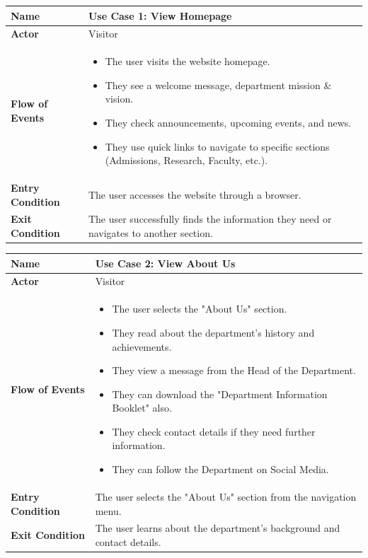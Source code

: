 \documentclass[11pt]{article}
\begin{document}
\begin{center}
\begin{tabular}{ | >{\bfseries}m{6em} | m{10cm} | }
  \hline
  \textbf{Name} & Use Case 1: View Homepage \\
  \hline
  \textbf{Actor} & Visitor \\
  \hline
  \textbf{Flow of Events} & 
  \begin{itemize}
      \item The user visits the website homepage.
      \item They see a welcome message, department mission \& vision.
      \item They check announcements, upcoming events, and news.
      \item They use quick links to navigate to specific sections (Admissions, Research, Faculty, etc.).
  \end{itemize} \\
  \hline
  \textbf{Entry Condition} & The user accesses the website through a browser. \\
  \hline
  \textbf{Exit Condition} & The user successfully finds the information they need or navigates to another section. \\
  \hline
\end{tabular}
\end{center}

\begin{center}
\begin{tabular}{ | >{\bfseries}m{6em} | m{10cm} | }
  \hline
  \textbf{Name} & Use Case 2: View About Us \\
  \hline
  \textbf{Actor} & Visitor \\
  \hline
  \textbf{Flow of Events} & 
  \begin{itemize}
      \item The user selects the "About Us" section.
      \item They read about the department’s history and achievements.
      \item They view a message from the Head of the Department.
      \item They can download the "Department Information Booklet" also.
      \item They check contact details if they need further information.
      \item They can follow the Department on Social Media.
  \end{itemize} \\
  \hline
  \textbf{Entry Condition} & The user selects the "About Us" section from the navigation menu. \\
  \hline
  \textbf{Exit Condition} & The user learns about the department’s background and contact details. \\
  \hline
\end{tabular}
\end{center}
\end{document}
